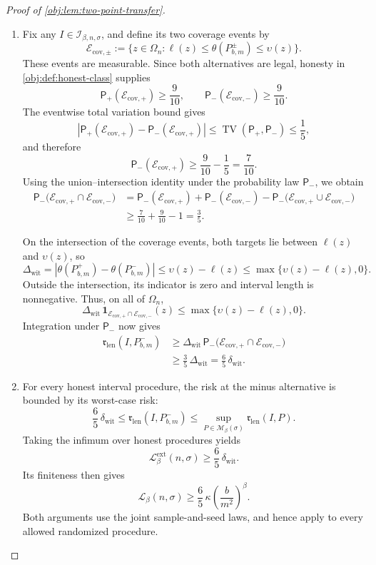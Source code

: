 \documentclass[11pt]{article}
\begin{document}
\begin{proof}[Proof of \cref{obj:lem:two-point-transfer}]
\begin{enumerate}
\item
Fix any \(I\in\mathcal I_{\beta,n,\sigma}\), and define its two coverage events by
\[
\mathcal E_{\mathrm{cov},\pm}
:=
\{z\in\Omega_n:
\ell(z)\le\theta(P^\pm_{b,m})\le\upsilon(z)\}.
\]
These events are measurable. Since both alternatives are legal, honesty in \cref{obj:def:honest-class} supplies
\[
\mathsf P_+(\mathcal E_{\mathrm{cov},+})\ge\frac9{10},
\qquad
\mathsf P_-(\mathcal E_{\mathrm{cov},-})\ge\frac9{10}.
\]
The eventwise total variation bound gives
\[
\left|
\mathsf P_+(\mathcal E_{\mathrm{cov},+})
-
\mathsf P_-(\mathcal E_{\mathrm{cov},+})
\right|
\le
\operatorname{TV}(\mathsf P_+,\mathsf P_-)
\le\frac15,
\]
and therefore
\[
\mathsf P_-(\mathcal E_{\mathrm{cov},+})
\ge\frac9{10}-\frac15=\frac7{10}.
\]
Using the union--intersection identity under the probability law \(\mathsf P_-\), we obtain
\[
\begin{aligned}
\mathsf P_-\bigl(
\mathcal E_{\mathrm{cov},+}\cap\mathcal E_{\mathrm{cov},-}
\bigr)
&=
\mathsf P_-(\mathcal E_{\mathrm{cov},+})
+
\mathsf P_-(\mathcal E_{\mathrm{cov},-})
-
\mathsf P_-\bigl(
\mathcal E_{\mathrm{cov},+}\cup\mathcal E_{\mathrm{cov},-}
\bigr)
\\
&\ge
\frac7{10}+\frac9{10}-1
=
\frac35.
\end{aligned}
\]

On the intersection of the coverage events, both targets lie between \(\ell(z)\) and \(\upsilon(z)\), so
\[
\Delta_{\mathrm{wit}}
=
|\theta(P^+_{b,m})-\theta(P^-_{b,m})|
\le
\upsilon(z)-\ell(z)
\le
\max\{\upsilon(z)-\ell(z),0\}.
\]
Outside the intersection, its indicator is zero and interval length is nonnegative. Thus, on all of \(\Omega_n\),
\[
\Delta_{\mathrm{wit}}\,
\mathbf1_{\mathcal E_{\mathrm{cov},+}\cap\mathcal E_{\mathrm{cov},-}}(z)
\le
\max\{\upsilon(z)-\ell(z),0\}.
\]
Integration under \(\mathsf P_-\) now gives
\[
\begin{aligned}
\mathfrak r_{\mathrm{len}}(I,P^-_{b,m})
&\ge
\Delta_{\mathrm{wit}}\,
\mathsf P_-\bigl(
\mathcal E_{\mathrm{cov},+}\cap\mathcal E_{\mathrm{cov},-}
\bigr)
\\
&\ge
\frac35\,\Delta_{\mathrm{wit}}
=
\frac65\,\delta_{\mathrm{wit}}.
\end{aligned}
\]

\item
For every honest interval procedure, the risk at the minus alternative is bounded by its worst-case risk:
\[
\frac65\,\delta_{\mathrm{wit}}
\le
\mathfrak r_{\mathrm{len}}(I,P^-_{b,m})
\le
\sup_{P\in\mathcal M_\beta(\sigma)}
\mathfrak r_{\mathrm{len}}(I,P).
\]
Taking the infimum over honest procedures yields
\[
\mathcal L^{\mathrm{ext}}_\beta(n,\sigma)
\ge
\frac65\,\delta_{\mathrm{wit}}.
\]
Its finiteness then gives
\[
\mathcal L_\beta(n,\sigma)
\ge
\frac65\,\kappa\left(\frac{b}{m^2}\right)^\beta.
\]
Both arguments use the joint sample-and-seed laws, and hence apply to every allowed randomized procedure.
\end{enumerate}
\end{proof}
\end{document}
